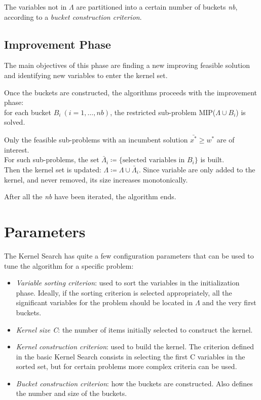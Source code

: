 The variables not in \(\Lambda\) are partitioned into a certain number of buckets \textit{nb}, according
to a \textit{bucket construction criterion}.

\subsection{Improvement Phase}
The main objectives of this phase are finding a new improving feasible solution and identifying new variables
to enter the kernel set.

Once the buckets are constructed, the algorithms proceeds with the improvement phase:\\
for each bucket \(B_{i} \ (i=1,\dots,nb)\),
the restricted sub-problem MIP(\(\Lambda \cup B_{i}\)) is solved.

Only the feasible sub-problems with an incumbent solution \(\bar{x^{*}} \geq w^{*}\) are of interest.\\
For such sub-problems, the set \(\bar{\Lambda}_{i} \coloneqq \{\text{selected variables in } B_{i}\}\) is built.\\
Then the kernel set is updated: \(\Lambda \coloneqq \Lambda \cup \bar{\Lambda}_{i}\).
Since variable are only added to the kernel, and never removed, its size increases monotonically.

After all the \textit{nb} have been iterated, the algorithm ends.


\section{Parameters}
The Kernel Search has quite a few configuration parameters that can be used to tune the algorithm for a specific
problem:
\begin{itemize}
    \item \textit{Variable sorting criterion}: used to sort the variables in the initialization phase.
    Ideally, if the sorting criterion is selected appropriately,
    all the significant variables for the problem should be located in \(\Lambda\) and the very first buckets.
    \item \textit{Kernel size C}: the number of items initially selected to construct the kernel.
    \item \textit{Kernel construction criterion}: used to build the kernel.
    The criterion defined in the basic Kernel Search consists in selecting
    the first C variables in the sorted set, but for certain problems more complex criteria can be used.
    \item \textit{Bucket construction criterion}: how the buckets are constructed.
    Also defines the number and size of the buckets.
\end{itemize}


